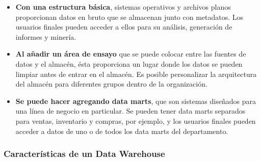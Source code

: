 \documentclass[11pt,a4paper]{article}
\begin{document}
			\begin{itemize}
				\item \textbf{Con una estructura básica}, sistemas operativos y archivos planos proporcionan datos en bruto que se almacenan junto con metadatos. Los usuarios finales pueden acceder a ellos para su análisis, generación de informes y minería.
								
		        \item \textbf{Al añadir un área de ensayo} que se puede colocar entre las fuentes de datos y el almacén, ésta proporciona un lugar donde los datos se pueden limpiar antes de entrar en el almacén. Es posible personalizar la arquitectura del almacén para diferentes grupos dentro de la organización.
		        
		        \item \textbf{Se puede hacer agregando data marts}, que son sistemas diseñados para una línea de negocio en particular. Se pueden tener data marts separados para ventas, inventario y compras, por ejemplo, y los usuarios finales pueden acceder a datos de uno o de todos los data marts del departamento.
				
			\end{itemize}
			
			\subsubsection{Características de un Data Warehouse}
			
\end{document}
